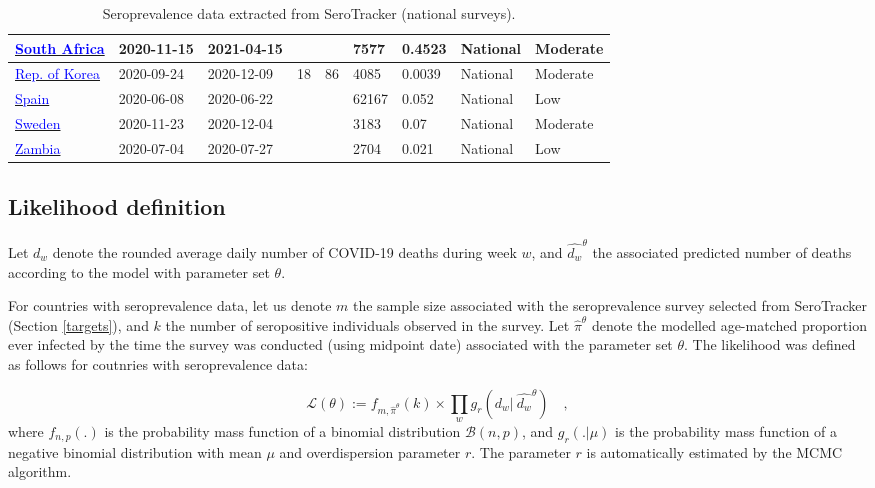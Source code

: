 \begin{table}[!ht]
\begin{center}
\begin{tabular}{p{2cm} | p{1.6cm} | p{1.6cm} | p{0.8cm} | p{0.8cm} | p{1cm} | p{1.3cm} | p{1.2cm} | p{1.2cm}}
\hline 
\href{https://dx.doi.org/10.1093/cid/ciac198}{\textcolor{blue}{South Africa}} & 2020-11-15 & 2021-04-15 &  &  & 7577 & 0.4523 & National & Moderate \\ 
\hline 
\href{https://bmjopen.bmj.com/content/11/4/e049837.abstract}{\textcolor{blue}{Rep. of Korea}} & 2020-09-24 & 2020-12-09 & 18 & 86 & 4085 & 0.0039 & National & Moderate \\ 
\hline 
\href{https://www.mscbs.gob.es/ciudadanos/ene-covid/docs/ESTUDIO\_ENE-COVID19\_INFORME\_FINAL.pdf}{\textcolor{blue}{Spain}} & 2020-06-08 & 2020-06-22 &  &  & 62167 & 0.052 & National & Low \\ 
\hline 
\href{https://www.folkhalsomyndigheten.se/contentassets/376f9021a4c84da08de18ac597284f0c/pavisning-antikroppar-genomgangen-covid-19-blodgivare-delrapport-2.pdf}{\textcolor{blue}{Sweden}} & 2020-11-23 & 2020-12-04 &  &  & 3183 & 0.07 & National & Moderate \\ 
\hline 
\href{https://www.thelancet.com/journals/langlo/article/PIIS2214-109X(21)00053-X/fulltext}{\textcolor{blue}{Zambia}} & 2020-07-04 & 2020-07-27 &  &  & 2704 & 0.021 & National & Low \\ 
\hline 

    \end{tabular}
    \end{center}
    \caption{Seroprevalence data extracted from SeroTracker (national surveys).}
    \label{tab:sero_national}
\end{table}


\subsection{Likelihood definition}
\label{likelihood}
Let $d_w$ denote the rounded average daily number of COVID-19 deaths during week $w$, and $\hat{d_w}^\theta$ 
the associated predicted number of deaths according to the model with parameter set $\theta$. 

For countries with seroprevalence data, let us denote $m$ the sample size associated with the seroprevalence survey selected from SeroTracker (Section \ref{targets}), 
and $k$ the number of seropositive individuals observed in the survey.
Let $\hat{\pi}^\theta$ denote the modelled age-matched proportion ever infected by the time the survey was conducted (using midpoint date) 
associated with the parameter set $\theta$. 
The likelihood was defined as follows for coutnries with seroprevalence data:

\begin{equation}
    \label{eq:likelihood}
    \mathcal{L}(\theta) := f_{m,\hat{\pi}^\theta}(k) \times \prod_w g_r(d_w | \:\hat{d_w}^\theta) \quad ,
\end{equation}
where $f_{n,p}(.)$ is the probability mass function of a binomial distribution $\mathcal{B}(n,p)$, and 
$g_r(. | \mu)$ is the probability mass function of a negative binomial distribution with mean $\mu$ and 
overdispersion parameter $r$. The parameter $r$ is automatically estimated by the MCMC algorithm.

